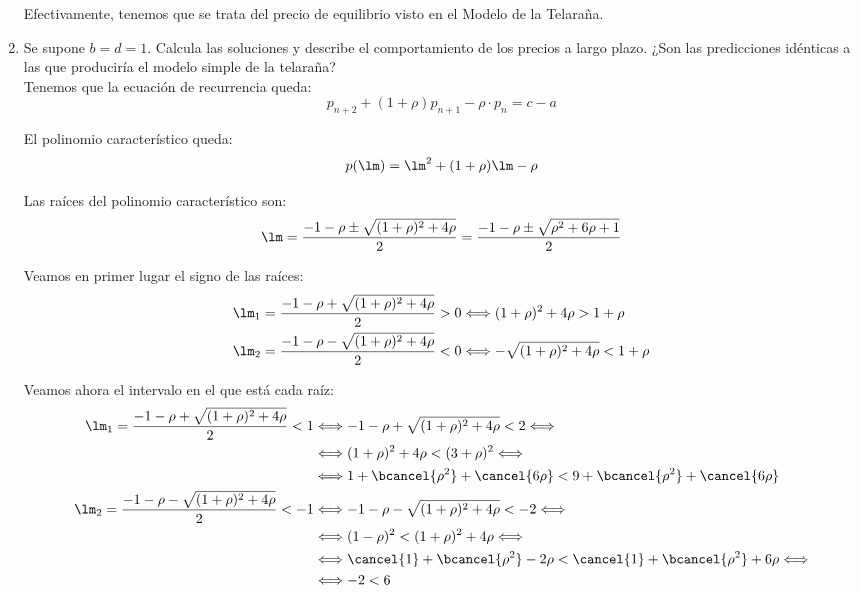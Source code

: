 \begin{ejercicio}
\begin{enumerate}
        Efectivamente, tenemos que se trata del precio de equilibrio visto en el Modelo de la Telaraña.
        
        \item Se supone $b = d = 1$. Calcula las soluciones y describe el comportamiento de los precios a largo plazo. ¿Son
        las predicciones idénticas a las que produciría el modelo simple de la telaraña?\\

        Tenemos que la ecuación de recurrencia queda:
        \begin{equation*}
            p_{n+2} +(1+\rho)p_{n+1}-\rho\cdot p_{n} = c-a
        \end{equation*}

        El polinomio característico queda:
        \begin{equation*}
            p(\lm) = \lm^2 +(1+\rho)\lm-\rho
        \end{equation*}

        Las raíces del polinomio característico son:
        \begin{equation*}
            \lm = \frac{-1-\rho \pm \sqrt{(1+\rho)^2 +4\rho}}{2}
            = \frac{-1-\rho \pm \sqrt{\rho^2+6\rho+1}}{2}
        \end{equation*}

        Veamos en primer lugar el signo de las raíces:
        \begin{align*}
             \lm_1 = \frac{-1-\rho + \sqrt{(1+\rho)^2 +4\rho}}{2} > 0
             &\Longleftrightarrow
             (1+\rho)^2 +4\rho > 1+\rho \\
             \lm_2 = \frac{-1-\rho - \sqrt{(1+\rho)^2 +4\rho}}{2} < 0
             &\Longleftrightarrow -\sqrt{(1+\rho)^2 +4\rho} < 1+\rho
        \end{align*}

        Veamos ahora el intervalo en el que está cada raíz:
        \begin{align*}
             \lm_1 = \frac{-1-\rho + \sqrt{(1+\rho)^2 +4\rho}}{2} < 1
             &\Longleftrightarrow
             -1-\rho + \sqrt{(1+\rho)^2 +4\rho} < 2
             \Longleftrightarrow \\ &\Longleftrightarrow
             (1+\rho)^2 +4\rho < (3+\rho)^2
             \Longleftrightarrow \\ &\Longleftrightarrow
             1 + \bcancel{\rho^2} +\cancel{6\rho}  < 9 + \bcancel{\rho^2} +\cancel{6\rho} \\
             \lm_2 = \frac{-1-\rho - \sqrt{(1+\rho)^2 +4\rho}}{2} < -1
             &\Longleftrightarrow
             -1-\rho - \sqrt{(1+\rho)^2 +4\rho} < -2
             \Longleftrightarrow \\ &\Longleftrightarrow
             (1-\rho)^2 < (1+\rho)^2 +4\rho
             \Longleftrightarrow \\ &\Longleftrightarrow
             \cancel{1} + \bcancel{\rho^2} -2\rho  < \cancel{1} + \bcancel{\rho^2} +{6\rho}
             \Longleftrightarrow \\ &\Longleftrightarrow
             -2<6
        \end{align*}


\end{enumerate}
\end{ejercicio}
